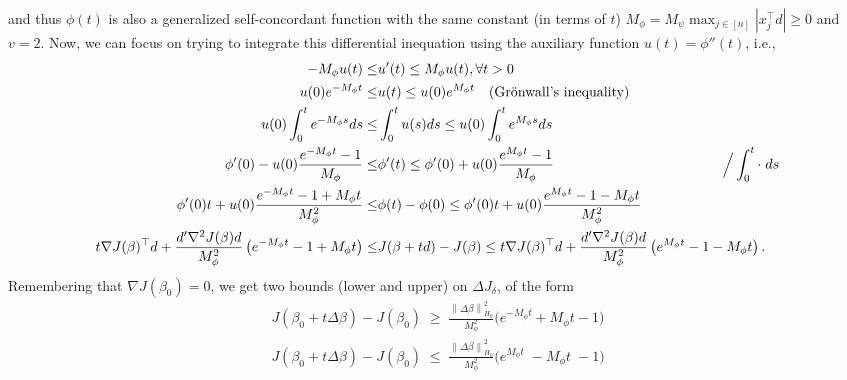 \documentclass[11pt]{article}
\theoremstyle{plain}
\theoremstyle{definition}
\newcommand{\norm}[1]{\left\lVert #1 \right\rVert}
\newcommand{\1}{\mathbf{1}}
\renewcommand{\t}{^{\top}}
\begin{document}
and thus $\phi(t)$ is also a generalized self-concordant function with the same constant (in terms of $t$) $M_\phi=M_\psi\max_{j\in[n]}{|x_j\t d|}\geq0$ and $v=2$. Now, we can focus on trying to integrate this differential inequation using the auxiliary function $u(t)=\phi''(t)$, i.e.,
\begin{align*}
   -M_\phi u(t)\leq&  u'(t)\leq M_\phi u(t), \forall t >0&\\
    u(0) e^{-M_{\phi}t} \leq& u(t) \leq u(0) e^{M_{\phi}t} \quad \text{(Grönwall's inequality)}\\
    u(0) \int_{0}^t e^{-M_{\phi}s}ds \leq& \int_{0}^t u(s) ds\leq u(0) \int_{0}^t e^{M_{\phi}s}ds\\
    \phi'(0)-u(0) \frac{e^{-M_\phi t} - 1}{M_\phi} \leq& \phi'(t)\leq \phi'(0)+ u(0)\frac{e^{M_\phi t} - 1}{M_\phi} & \text{\hspace{-2cm}} \Big/ \int_{0}^t \cdot \;ds\\
    \phi'(0)t+u(0) \frac{e^{-M_\phi t} - 1+M_\phi t}{M_\phi^2} \leq& \phi(t)-\phi(0)\leq \phi'(0)t+ u(0)\frac{e^{M_\phi t} - 1-M_\phi t}{M_\phi^2}\\
    t\nabla J(\beta)\t d+ \frac{d'\nabla^2J(\beta)d}{M_\phi^2} \left({e^{-M_\phi t} - 1+M_\phi t}\right) \leq& J(\beta+td)-J(\beta)\leq t\nabla J(\beta)\t d+ \frac{d'\nabla^2J(\beta)d}{M_\phi^2} \left(e^{M_\phi t} - 1-M_\phi t\right).\\
\end{align*}
Remembering that $\nabla J(\beta_0)=0$, we get two bounds (lower and upper) on $\Delta J_\delta$, of the form 
\begin{align}
\label{ineq:exponential_LB}
\boxed{J(\beta_0+t \Delta \beta)- J(\beta_0)\;\ge\; \frac{\norm{\Delta\beta}_{H_0}^2}{M_\phi^2}\Big(e^{-M_\phi t}+M_\phi t - 1\Big)}\\
\label{ineq:exponential_UB}
 \boxed{J(\beta_0+t \Delta \beta)- J(\beta_0)\;\le\; \frac{\norm{\Delta\beta}_{H_0}^2}{M_\phi^2}\Big(e^{M_\phi t}\;-M_\phi t\; - 1\Big)}
\end{align}
\end{document}
